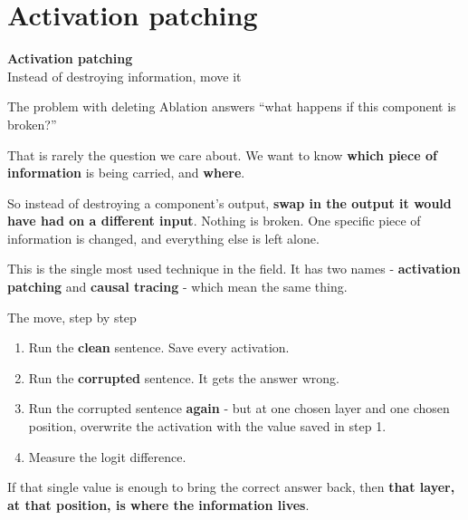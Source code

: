 \documentclass[aspectratio=169]{beamer}
\newcommand{\keybox}[1]{%
  \begin{tcolorbox}[colback=armblue!8, colframe=armblue, boxrule=0.6pt, arc=2pt]
  #1
  \end{tcolorbox}}
\newcommand{\sectiontransition}[2]{%
  \begin{frame}[plain]
    \vfill
    \begin{center}
      {\Huge\bfseries\color{popblue} #1}\\[1.1em]
      {\large #2}
    \end{center}
    \vfill
  \end{frame}}
\begin{document}
\section{Activation patching}
\sectiontransition{Activation patching}{Instead of destroying information, move it}

\begin{frame}{The problem with deleting}
  \vspace{0.8em}
  Ablation answers ``what happens if this component is broken?''

  \vspace{0.6em}
  That is rarely the question we care about. We want to know \textbf{which piece of information}
  is being carried, and \textbf{where}.

  \vspace{1.0em}
  \keybox{So instead of destroying a component's output, \textbf{swap in the output it would have
  had on a different input}. Nothing is broken. One specific piece of information is changed, and
  everything else is left alone.}

  \vspace{0.9em}
  This is the single most used technique in the field. It has two names - \textbf{activation
  patching} and \textbf{causal tracing} - which mean the same thing.
\end{frame}

\begin{frame}{The move, step by step}
  \vspace{0.5em}
  \begin{enumerate}
    \item Run the \textbf{clean} sentence. Save every activation.
    \item Run the \textbf{corrupted} sentence. It gets the answer wrong.
    \item Run the corrupted sentence \textbf{again} - but at one chosen layer and one chosen
      position, overwrite the activation with the value saved in step 1.
    \item Measure the logit difference.
  \end{enumerate}

  \vspace{1.0em}
  \begin{center}
  \end{center}

  \vspace{0.7em}
  \keybox{If that single value is enough to bring the correct answer back, then \textbf{that
  layer, at that position, is where the information lives}.}
\end{frame}
\end{document}
